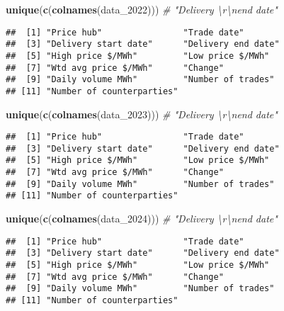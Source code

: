 \documentclass[
]{article}
\newenvironment{Shaded}{\begin{snugshade}}{\end{snugshade}}
\newcommand{\CommentTok}[1]{\textcolor[rgb]{0.56,0.35,0.01}{\textit{#1}}}
\newcommand{\FunctionTok}[1]{\textcolor[rgb]{0.13,0.29,0.53}{\textbf{#1}}}
\newcommand{\NormalTok}[1]{#1}
\begin{document}
\begin{Shaded}
\begin{Highlighting}[]
\FunctionTok{unique}\NormalTok{(}\FunctionTok{c}\NormalTok{(}\FunctionTok{colnames}\NormalTok{(data\_2022))) }\CommentTok{\# "Delivery \textbackslash{}r\textbackslash{}nend date"}
\end{Highlighting}
\end{Shaded}

\begin{verbatim}
##  [1] "Price hub"                "Trade date"              
##  [3] "Delivery start date"      "Delivery end date"       
##  [5] "High price $/MWh"         "Low price $/MWh"         
##  [7] "Wtd avg price $/MWh"      "Change"                  
##  [9] "Daily volume MWh"         "Number of trades"        
## [11] "Number of counterparties"
\end{verbatim}

\begin{Shaded}
\begin{Highlighting}[]
\FunctionTok{unique}\NormalTok{(}\FunctionTok{c}\NormalTok{(}\FunctionTok{colnames}\NormalTok{(data\_2023))) }\CommentTok{\# "Delivery \textbackslash{}r\textbackslash{}nend date"}
\end{Highlighting}
\end{Shaded}

\begin{verbatim}
##  [1] "Price hub"                "Trade date"              
##  [3] "Delivery start date"      "Delivery end date"       
##  [5] "High price $/MWh"         "Low price $/MWh"         
##  [7] "Wtd avg price $/MWh"      "Change"                  
##  [9] "Daily volume MWh"         "Number of trades"        
## [11] "Number of counterparties"
\end{verbatim}

\begin{Shaded}
\begin{Highlighting}[]
\FunctionTok{unique}\NormalTok{(}\FunctionTok{c}\NormalTok{(}\FunctionTok{colnames}\NormalTok{(data\_2024))) }\CommentTok{\# "Delivery \textbackslash{}r\textbackslash{}nend date"}
\end{Highlighting}
\end{Shaded}

\begin{verbatim}
##  [1] "Price hub"                "Trade date"              
##  [3] "Delivery start date"      "Delivery end date"       
##  [5] "High price $/MWh"         "Low price $/MWh"         
##  [7] "Wtd avg price $/MWh"      "Change"                  
##  [9] "Daily volume MWh"         "Number of trades"        
## [11] "Number of counterparties"
\end{verbatim}
\end{document}
